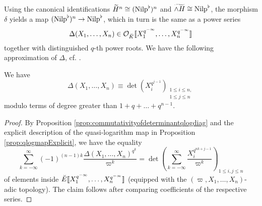 \documentclass[../main.tex]{subfiles}
\begin{document}
Using the canonical identifications $\widetilde{H}^n \cong ({\mathrm{Nilp}}^\flat)^n$
and $\widetilde{\wedge H} \cong {\mathrm{Nilp}}^\flat$, the morphism $\delta$ yields a 
map $({\mathrm{Nilp}}^\flat)^n \to {\mathrm{Nilp}}^\flat$, which in turn is the same as a power series 
\begin{equation*}
  \Delta(X_1, \dots, X_n) \in \mathcal{O}_{\breve K}\llbracket X_1^{q^{-\infty}}, \dots,
  X_n^{q^{-\infty}}\rrbracket
\end{equation*}
together with distinguished $q$-th power roots. 
We have the following approximation of $\Delta$, cf. \cite[Lemma 2.10.4]{BoyarchenkoWeinstein2011MaxVar}. 
\begin{lem}\label{lem:DeltaApprox}
  We have 
  \begin{equation*}
    \Delta(X_1, \dots, X_n) \equiv \det(X_i^{q^{j-1}})_{\substack{1 \leq
  i \leq n,\\ 1 \leq j \leq n}} 
  \end{equation*}
  modulo terms of degree greater than $1 + q + \dots + q^{n-1}$.
\begin{proof}
  By Proposition \ref{prop:commutativityofdeterminantqlogdiag} and 
  the explicit description of the quasi-logarithm map in Proposition
  \ref{prop:qlogmapExplicit}, we have the equality
  \begin{equation*}
    \sum_{k = -\infty}^\infty (-1)^{(n-1) k} \frac{\Delta(X_1, \dots,
    X_n)^{q^k}}{\varpi^k} = 
    \det \left( \sum_{k = -\infty}^\infty
    \frac{X_i^{q^{nk + j-1}}}{\varpi^k} \right)_{1 \leq i, j \leq n}
  \end{equation*}
  of elements inside ${\breve {E}} \llbracket X_1^{q^{-\infty}}, \dots, X_n^{q^{-\infty}} \rrbracket$
  (equipped with the $(\varpi, X_1, \dots, X_n)$-adic topology).
  The claim follows after comparing coefficients of the respective series. 
\end{proof}
\end{lem}



\end{document}
